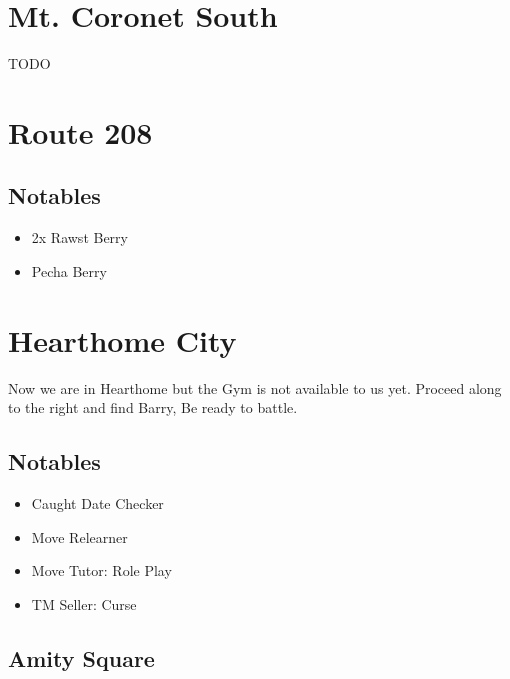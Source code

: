 \documentclass[11pt]{article}
\begin{document}
\section{Mt. Coronet South}\label{sec:mt.-coronet-south}
TODO

\section{Route 208}\label{sec:Route_208}

\subsection{Notables}\label{subsec:notables-route-208}

\begin{itemize}
    \item 2x Rawst Berry
    \item Pecha Berry
\end{itemize}





\section{Hearthome City}\label{sec:hearthome-city}
Now we are in Hearthome but the Gym is not available to us yet.
Proceed along to the right and find Barry, Be ready to battle.

\subsection{Notables}\label{subsec:notables-hearthome}

\begin{itemize}
    \item Caught Date Checker
    \item Move Relearner
    \item Move Tutor: Role Play
    \item TM Seller: Curse
\end{itemize}

\subsection{Amity Square}\label{subsec:amity-square}



\end{document}
